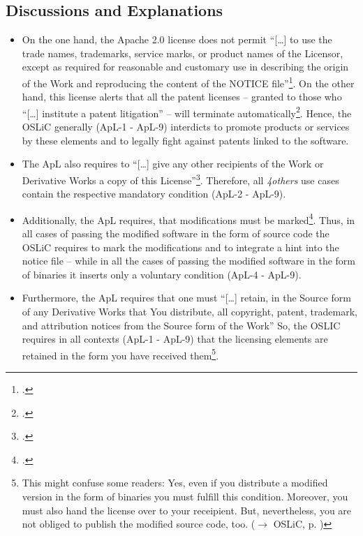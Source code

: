 \subsection{Discussions and Explanations}
\begin{itemize}
  \item On the one hand, the Apache 2.0 license does not permit
  \enquote{[\ldots] to use the trade names, trademarks, service marks, or
  product names of the Licensor, except as required for reasonable and customary
  use in describing the origin of the Work and reproducing the content of the
  NOTICE file}\footcite[cf.][\nopage wp\ §6]{Apl20OsiLicense2004a}. On the other
  hand, this license alerts that all the patent licenses – granted to those who
  \enquote{[\ldots] institute a patent litigation} – will terminate
  automatically\footcite[cf.][\nopage wp\ §3]{Apl20OsiLicense2004a}. Hence, the
  OSLiC generally (ApL-1 - ApL-9) interdicts to promote products or services by
  these elements and to legally fight against patents linked to the software.
  
  \item The ApL also requires to \enquote{[\ldots] give any other recipients of
  the Work or Derivative Works a copy of this License}\footcite[cf.][\nopage wp\
  §4.1]{Apl20OsiLicense2004a}. Therefore, all \emph{4others} use cases contain
  the respective mandatory condition (ApL-2 - ApL-9).
   
  \item Additionally, the ApL requires, that modifications must be
  marked\footcite[cf.][\nopage wp\ §4.2]{Apl20OsiLicense2004a}. Thus, in all
  cases of passing the modified software in the form of source code the OSLiC
  requires to mark the modifications and to integrate a hint into the notice
  file – while in all the cases of passing the modified software in the form of
  binaries it inserts only a voluntary condition (ApL-4 - ApL-9).
  
  \item Furthermore, the ApL requires that one must \enquote{[\ldots] retain, in
  the Source form of any Derivative Works that You distribute, all copyright,
  patent, trademark, and attribution notices from the Source form of the Work}
  So, the OSLIC requires in all contexts (ApL-1 - ApL-9) that the licensing
  elements are retained in the form you have received them\footnote{This might
  confuse some readers: Yes, even if you distribute a modified version in the
  form of binaries you must fulfill this condition. Moreover, you must also hand
  the license over to your receipient. But, nevertheless, you are not obliged to
  publish the modified source code, too. ($\rightarrow$ OSLiC, p.
  \pageref{sec:ProtectPowerOfApL})}.
  

\end{itemize}

